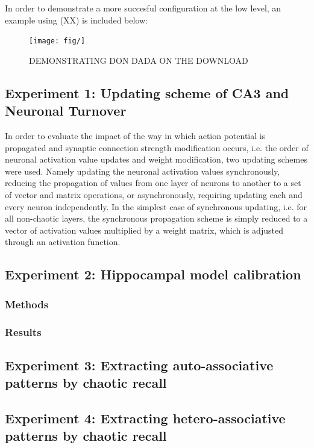 In order to demonstrate a more succesful configuration at the low level, an example using (XX) is included below:

\begin{figure}
    \centering
    \texttt{[image: fig/]}
    \caption{DEMONSTRATING DON DADA ON THE DOWNLOAD}
\end{figure}

\subsection{Experiment 1: Updating scheme of CA3 and Neuronal Turnover}

In order to evaluate the impact of the way in which action potential is propagated and synaptic connection strength modification occurs, i.e. the order of neuronal activation value updates and weight modification, two updating schemes were used. Namely updating the neuronal activation values synchronously, reducing the propagation of values from one layer of neurons to another to a set of vector and matrix operations, or asynchronously, requiring updating each and every neuron independently. In the simplest case of synchronous updating, i.e. for all non-chaotic layers, the synchronous propagation scheme is simply reduced to a vector of activation values multiplied by a weight matrix, which is adjusted through an activation function.

\subsection{Experiment 2: Hippocampal model calibration}
\subsubsection{Methods}
\subsubsection{Results}

\subsection{Experiment 3: Extracting auto-associative patterns by chaotic recall}
\subsection{Experiment 4: Extracting hetero-associative patterns by chaotic recall}

